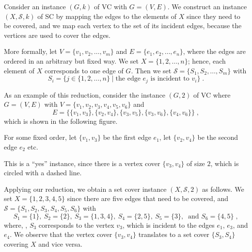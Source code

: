 \documentclass{exercise}
\begin{document}
  \begin{solution}
    Consider an instance $(G,k)$ of VC with $G=(V,E)$.  We construct an instance
    $(X,\mathcal{S},k)$ of SC by mapping the edges to the elements of $X$ since
    they need to be covered, and we map each vertex to the set of its incident
    edges, because the vertices are used to cover the edges.

    More formally, let $V=\{v_1,v_2,\dots,v_m\}$ and $E=\{e_1,e_2,\dots,e_n\}$,
    where the edges are ordered in an arbitrary but fixed way.
    We set $X=\{1,2,\dots,n\}$; hence, each element of $X$ corresponds to one edge
    of $G$. Then we set $\mathcal{S}=\{S_1,S_2,\dots,S_m\}$ with
    \[ S_i = \{j\in\{1,2,\dots,n\} \mid \text{the edge } e_j \text{ is incident to } v_i \}\; .\]

    As an example of this reduction, consider the instance $(G,2)$ of VC where $G=(V,E)$
    with $V=\{v_1,v_2,v_3,v_4,v_5,v_6\}$ and
    \[ E = \big\{ \{v_1,v_3\}, \{v_2,v_4\}, \{v_3,v_5\}, \{v_3,v_6\}, \{v_4,v_6\} \big\}\;, \]
    which is shown in the following figure.
  
    \begin{center} 
    \end{center} 

    For some fixed order, let $\{v_1,v_3\}$ be the first edge $e_1$, let $\{v_2,v_4\}$ be
		the second edge $e_2$ etc.

    This is a ``yes'' instance, since there is a vertex cover $\{v_3,v_4\}$ of size $2$,
    which is circled with a dashed line.

    Applying our reduction, we obtain a set cover instance $(X,\mathcal{S},2)$ as
    follows.  We set $X=\{1,2,3,4,5\}$ since there are five edges that need
    to be covered, and $\mathcal{S}=\{S_1,S_2,S_3,S_4,S_5,S_6\}$ with
    \[ S_1 = \{1\},\ S_2=\{2\},\ S_3=\{1,3,4\},\ S_4=\{2,5\},\ S_5=\{3\},\ \text{ and } S_6=\{4,5\}\;, \]
    where, \eg, $S_3$ corresponds to the vertex $v_3$, which is incident to the
    edges $e_1$, $e_3$, and $e_4$.
    We observe that the vertex cover $\{v_3,v_4\}$ translates to a set cover
    $\{S_3,S_4\}$ covering $X$ and vice versa.


\end{solution}
\end{document}
